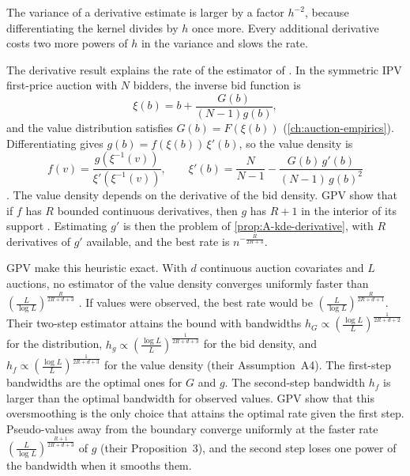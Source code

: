 The variance of a derivative estimate is larger by a factor $h^{-2}$, because differentiating the kernel
divides by $h$ once more. Every additional derivative costs two more powers of $h$ in the variance and
slows the rate.

The derivative result explains the rate of the estimator of \citet{GuerrePerrigneVuong2000}. In the
symmetric IPV first-price auction with $N$ bidders, the inverse bid function is
\begin{equation}\label{eq:A-gpv-xi}
\xi(b)=b+\frac{G(b)}{(N-1)g(b)},
\end{equation}
and the value distribution satisfies $G(b)=F(\xi(b))$ (\cref{ch:auction-empirics}). Differentiating
gives $g(b)=f(\xi(b))\,\xi'(b)$, so the value density is
\begin{equation}\label{eq:A-gpv-f}
f(v)=\frac{g(\xi^{-1}(v))}{\xi'(\xi^{-1}(v))},\qquad
\xi'(b)=\frac{N}{N-1}-\frac{G(b)\,g'(b)}{(N-1)\,g(b)^2}
\end{equation}
\citep[eq.~(11)]{GuerrePerrigneVuong2000}. The value density depends on the derivative of the bid
density. GPV show that if $f$ has $R$ bounded continuous derivatives, then $g$ has $R+1$ in the
interior of its support \citep[Proposition~1]{GuerrePerrigneVuong2000}. Estimating $g'$ is then the
problem of \cref{prop:A-kde-derivative}, with $R$ derivatives of $g'$ available, and the best rate is
$n^{-\frac{R}{2R+3}}$.

GPV make this heuristic exact. With $d$ continuous auction covariates and $L$ auctions, no estimator of
the value density converges uniformly faster than $(\frac{L}{\log L})^{\frac{R}{2R+d+3}}$
\citep[Theorem~2]{GuerrePerrigneVuong2000}. If values were observed, the best rate would be
$(\frac{L}{\log L})^{\frac{R}{2R+d+1}}$. Their two-step estimator attains the bound
\citep[Theorem~3]{GuerrePerrigneVuong2000} with bandwidths $h_G\propto(\frac{\log L}{L})^{\frac{1}{2R+d+2}}$
for the distribution, $h_g\propto(\frac{\log L}{L})^{\frac{1}{2R+d+3}}$ for the bid density, and
$h_f\propto(\frac{\log L}{L})^{\frac{1}{2R+d+3}}$ for the value density (their Assumption~A4). The
first-step bandwidths are the optimal ones for $G$ and $g$. The second-step bandwidth $h_f$ is larger
than the optimal bandwidth for observed values. GPV show that this oversmoothing is the only choice
that attains the optimal rate given the first step. Pseudo-values away from the boundary converge
uniformly at the faster rate $(\frac{L}{\log L})^{\frac{R+1}{2R+d+3}}$ of $\hat g$ (their
Proposition~3), and the second step loses one power of the bandwidth when it smooths them.

